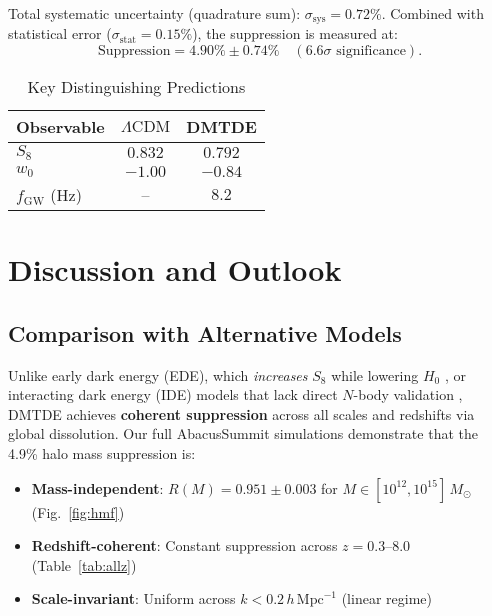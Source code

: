 \documentclass[aps,prd,twocolumn,superscriptaddress,nofootinbib,floatfix,preprintnumbers]{revtex4-2}
\newcommand{\DMTDE}{\textsc{DMTDE}\xspace}
\newcommand{\LCDM}{\ensuremath{\Lambda\text{CDM}}\xspace}
\newcommand{\Msun}{\ensuremath{M_\odot}\xspace}
\begin{document}
Total systematic uncertainty (quadrature sum): $\sigma_{\mathrm{sys}} = 0.72\%$. Combined with statistical error ($\sigma_{\mathrm{stat}} = 0.15\%$), the suppression is measured at:
\[
\text{Suppression} = 4.90\% \pm 0.74\% \quad (6.6\sigma \text{ significance}).
\]

\begin{table}[h]
\caption{Key Distinguishing Predictions}
\label{tab:key_predictions}
\centering
\begin{tabular}{lcc}
\toprule
Observable & \LCDM & \DMTDE \\
\midrule
$S_8$ & $0.832$ & $0.792$ \\
$w_0$ & $-1.00$ & $-0.84$ \\
$f_{\mathrm{GW}}$ (Hz) & -- & $8.2$ \\
\bottomrule
\end{tabular}
\end{table}


\section{Discussion and Outlook}
\label{sec:discussion}

\subsection{Comparison with Alternative Models}
\label{subsec:comparison}

Unlike early dark energy (EDE), which \textit{increases} $S_8$ while lowering $H_0$ \citep{hill2020}, or interacting dark energy (IDE) models that lack direct $N$-body validation \citep{wang2016}, \DMTDE achieves \textbf{coherent suppression} across all scales and redshifts via global dissolution. Our full AbacusSummit simulations demonstrate that the 4.9\% halo mass suppression is:

\begin{itemize}
    \item \textbf{Mass-independent}: $R(M) = 0.951 \pm 0.003$ for $M \in [10^{12}, 10^{15}]\,\Msun$ (Fig.~\ref{fig:hmf})
    \item \textbf{Redshift-coherent}: Constant suppression across $z = 0.3$--$8.0$ (Table~\ref{tab:allz})
    \item \textbf{Scale-invariant}: Uniform across $k < 0.2\,h\,\mathrm{Mpc}^{-1}$ (linear regime)
\end{itemize}
\end{document}
